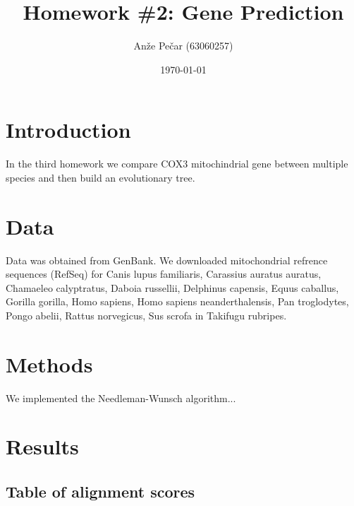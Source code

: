 \documentclass[a4paper,11pt]{article}
\title{Homework \#2: Gene Prediction}
\author{Anže Pečar (63060257)}
\date{\today}
\begin{document}
\maketitle

\section{Introduction}

In the third homework we compare COX3 mitochindrial gene between multiple species and then build an evolutionary tree.

\section{Data}

Data was obtained from GenBank. We downloaded mitochondrial refrence sequences (RefSeq) for Canis lupus familiaris, Carassius auratus auratus, Chamaeleo calyptratus, Daboia russellii, Delphinus capensis, Equus caballus, Gorilla gorilla, Homo sapiens, Homo sapiens neanderthalensis, Pan troglodytes, Pongo abelii, Rattus norvegicus, Sus scrofa in Takifugu rubripes.

\section{Methods}

We implemented the Needleman-Wunsch algorithm...

\section{Results}

\subsection{Table of alignment scores}
\end{document}
